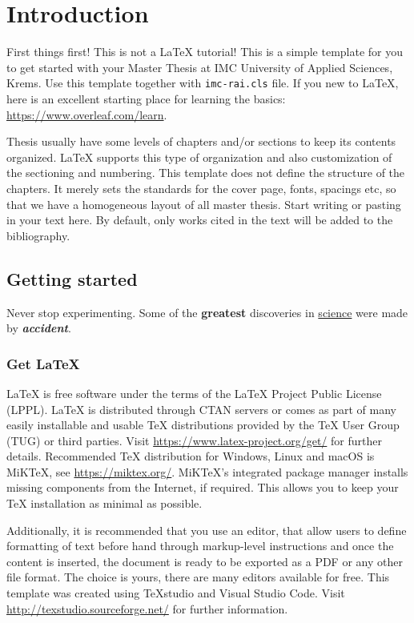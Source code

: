 \documentclass{imc-rai}
\begin{document}
\chapter{Introduction}\label{chap:introduction}


First things first! This is not a \LaTeX{} tutorial! This is a simple template for you to get started with your Master Thesis at IMC University of Applied Sciences, Krems. Use this template together with \texttt{imc-rai.cls} file. If you new to \LaTeX{}, here is an excellent starting place for learning the basics: \url{https://www.overleaf.com/learn}.


Thesis usually have some levels of chapters and/or sections to keep its contents organized. \LaTeX{} supports this type of organization and also customization of the sectioning and numbering. This template does not define the structure of the chapters. It merely sets the standards for the cover page, fonts, spacings etc, so that we have a homogeneous layout of all master thesis. Start writing or pasting in your text here. By default, only works cited in the text will be added to the bibliography. 

\section{Getting started}

Never stop experimenting. Some of the \textbf{greatest} discoveries in \underline{science} were made by \textbf{\textit{accident}}.

\subsection{Get \LaTeX{}}
\LaTeX{} is free software under the terms of the \LaTeX{} Project Public License (LPPL). \LaTeX{} is distributed through CTAN servers or comes as part of many easily installable and usable TeX distributions provided by the TeX User Group (TUG) or third parties. Visit \url{https://www.latex-project.org/get/} for further details. Recommended TeX distribution for Windows, Linux and macOS is MiKTeX, see \url{https://miktex.org/}. MiKTeX's integrated package manager installs missing components from the Internet, if required. This allows you to keep your TeX installation as minimal as possible. 

Additionally, it is recommended that you use an editor, that allow users to define formatting of text before hand through markup-level instructions and once the content is inserted, the document is ready to be exported as a PDF or any other file format. The choice is yours, there are many editors available for free. This template was created using TeXstudio and Visual Studio Code. Visit \url{http://texstudio.sourceforge.net/} for further information. 
\end{document}
